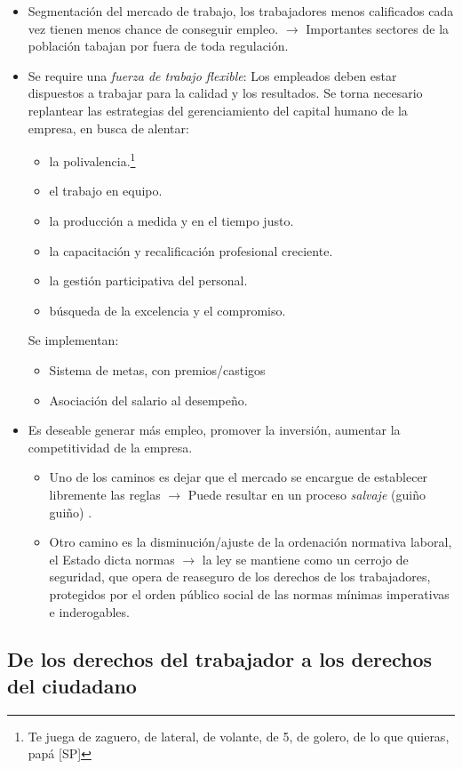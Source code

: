 \documentclass[spanish,12pt,a4paper,titlepage]{report}
\begin{document}
\begin{itemize}
\item Segmentación del mercado de trabajo, los trabajadores menos calificados cada vez tienen menos chance de conseguir empleo. $\rightarrow$ Importantes sectores de la población tabajan por fuera de toda regulación.
\item Se require una \textit{fuerza de trabajo flexible}: Los empleados deben estar dispuestos a trabajar para la calidad y los resultados.
Se torna necesario replantear las estrategias del gerenciamiento del capital humano de la empresa, en busca de alentar:
  \begin{itemize}
  \item la polivalencia.\footnote{Te juega de zaguero, de lateral, de volante, de 5, de golero, de lo que quieras, papá [SP]}
  \item el trabajo en equipo.
  \item la producción a medida y en el tiempo justo.
  \item la capacitación y recalificación profesional creciente.
  \item la gestión participativa del personal.
  \item búsqueda de la excelencia y el compromiso.
  \end{itemize}
  Se implementan:
  \begin{itemize}
  \item Sistema de metas, con premios/castigos
  \item Asociación del salario al desempeño.
  \end{itemize}
\item Es deseable generar más empleo, promover la inversión, aumentar la competitividad de la empresa.
  \begin{itemize}
  \item Uno de los caminos es dejar que el mercado se encargue de establecer libremente las reglas $\rightarrow$ Puede resultar en un proceso \textit{salvaje} (guiño guiño) .
  \item Otro camino es la disminución/ajuste de la ordenación normativa laboral, el Estado dicta normas $\rightarrow$ la ley se mantiene como un cerrojo de seguridad, que opera de reaseguro de los derechos de los trabajadores, protegidos por el orden público social de las normas mínimas imperativas e inderogables.
  \end{itemize}
\end{itemize}

\subsection{De los derechos del trabajador a los derechos del ciudadano}
\label{sec:De-los-derechos-del-trabajador-a-los-derechos-del-ciudadano}
\end{document}

